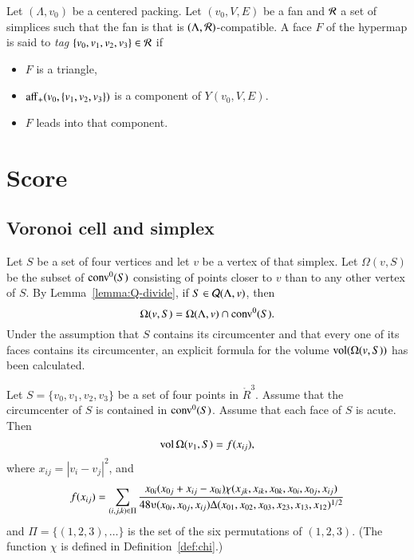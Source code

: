 \begin{definition}[tag]
Let $(\Lambda,v_0)$ be a centered packing.  Let $(v_0,V,E)$ be a fan
and ${\mathcal R}$ a set of simplices such that the fan is
that is $(\Lambda,{\mathcal R})$-compatible.  A face $F$ of the hypermap is said
to {\it tag} $\{v_0,v_1,v_2,v_3\}\in {\mathcal R}$ if 
\begin{itemize}
 \item $F$ is a triangle,
 \item  ${\operatorname{aff}}_+(v_0,\{v_1,v_2,v_3\})$ is a component of
  $Y(v_0,V,E)$.
 \item $F$ leads into that component.
\end{itemize}
\end{definition}


\section{Score}





\subsection{Voronoi cell and simplex}


Let $S$ be a set of four vertices and let $v$ be a vertex of that simplex. Let
$\Omega(v,S)$ be the subset of ${\operatorname{conv}}^0(S)$ consisting of points closer
to $v$ than to any other vertex of $S$. By
Lemma~\ref{lemma:Q-divide}, if $S\in{\mathcal Q}(\Lambda,v)$, then
$$\Omega(v,S) = \Omega(\Lambda,v)\cap{\operatorname{conv}}^0(S).$$
Under the assumption that $S$ contains its circumcenter and that
every one of its faces contains its circumcenter, an explicit
formula for the volume ${\operatorname{vol}}(\Omega(v,S))$ has been
calculated.  %

\begin{lemma}  Let $S = \{v_0,v_1,v_2,v_3\}$ be a set of four points in $\ring{R}^3$.
Assume that the circumcenter of $S$ is contained in ${\operatorname{conv}}^0(S)$.  Assume
that each face of $S$ is acute.
Then 
  $$
  {\operatorname{vol}}\,\Omega(v_1,S) = f(x_{ij}),
  $$ 
where $x_{ij} = |v_i-v_j|^2$, and
$$
   f(x_{ij}) = \sum_{(i,j,k)\in \Pi} \frac{x_{0i} (x_{0j}+x_{ij}-x_{0i})\chi(x_{jk},x_{ik},x_{0k},x_{0i},x_{0j},x_{ij})}
   {48\ups(x_{0i},x_{0j},x_{ij})\Delta(x_{01},x_{02},x_{03},x_{23},x_{13},x_{12})^{1/2}}
$$
and $\Pi = \{(1,2,3),\ldots\}$ is the set of the six permutations of $(1,2,3)$.
(The function $\chi$ is defined in Definition~\ref{def:chi}.)
\end{lemma}

